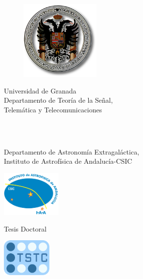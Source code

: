 	\pagestyle{empty}

	\begin{center}
		\begin{figure}[h]
			\centering
				\includegraphics[width=4cm]
				{fig/EscudoUniversidadColorSombraBisel.png}
		\end{figure}
		{\LARGE Universidad de Granada\\}
		\vspace{0.2cm}
		{\large Departamento de Teoría de la Señal,\\
		        Telemática y Telecomunicaciones\\}
		
		\vfill
		
		{\LARGE\textbf{\thesistitle}\\}
		
		\vfill
		
		{\Large \thesisauthor\\
		{\large Departamento de Astronomía Extragaláctica,\\
		Instituto de Astrofísica de Andalucía-CSIC}}
		
		\vfill
		
		\begin{minipage}{3cm}
			\begin{center}
				\includegraphics[width=3cm]
				{fig/LogoIAA.pdf}
			\end{center}
		\end{minipage}
		\begin{minipage}{6cm}
			\begin{center}
				\vfill
				{\Large Tesis Doctoral}
				\vfill
			\end{center}
		\end{minipage}
		\begin{minipage}{3cm}
			\begin{center}
				\includegraphics[width=2.5cm]
				{fig/LogoTSTC.pdf}
			\end{center}
		\end{minipage}
	\end{center}

